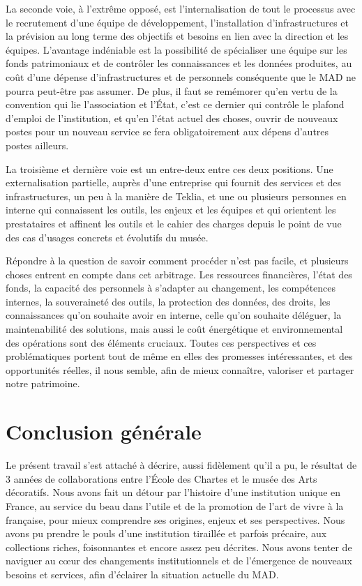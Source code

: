 La seconde voie, à l'extrême opposé, est l'internalisation de tout le processus avec le recrutement d'une équipe de développement, l'installation d'infrastructures et la prévision au long terme des objectifs et besoins en lien avec la direction et les équipes. L'avantage indéniable est la possibilité de spécialiser une équipe sur les fonds patrimoniaux et de contrôler les connaissances et les données produites, au coût d'une dépense d'infrastructures et de personnels conséquente que le MAD ne pourra peut-être pas assumer. De plus, il faut se remémorer qu'en vertu de la convention qui lie l'association et l'État, c'est ce dernier qui contrôle le plafond d'emploi de l'institution, et qu'en l'état actuel des choses, ouvrir de nouveaux postes pour un nouveau service se fera obligatoirement aux dépens d'autres postes ailleurs. 

La troisième et dernière voie est un entre-deux entre ces deux positions. Une externalisation partielle, auprès d'une entreprise qui fournit des services et des infrastructures, un peu à la manière de Teklia, et une ou plusieurs personnes en interne qui connaissent les outils, les enjeux et les équipes et qui orientent les prestataires et affinent les outils et le cahier des charges depuis le point de vue des cas d'usages concrets et évolutifs du musée.

Répondre à la question de savoir comment procéder n'est pas facile, et plusieurs choses entrent en compte dans cet arbitrage. Les ressources financières, l'état des fonds, la capacité des personnels à s'adapter au changement, les compétences internes, la souveraineté des outils, la protection des données, des droits, les connaissances qu'on souhaite avoir en interne, celle qu'on souhaite déléguer, la maintenabilité des solutions, mais aussi le coût énergétique et environnemental des opérations sont des éléments cruciaux. Toutes ces perspectives et ces problématiques portent tout de même en elles des promesses intéressantes, et des opportunités réelles, il nous semble, afin de mieux connaître, valoriser et partager notre patrimoine. 

\chapter*{Conclusion générale}

Le présent travail s'est attaché à décrire, aussi fidèlement qu'il a pu, le résultat de 3 années de collaborations entre l'École des Chartes et le musée des Arts décoratifs. Nous avons fait un détour par l'histoire d'une institution unique en France, au service du beau dans l'utile et de la promotion de l'art de vivre à la française, pour mieux comprendre ses origines, enjeux et ses perspectives. Nous avons pu prendre le pouls d'une institution tiraillée et parfois précaire, aux collections riches, foisonnantes et encore assez peu décrites. Nous avons tenter de naviguer au cœur des changements institutionnels et de l'émergence de nouveaux besoins et services, afin d'éclairer la situation actuelle du MAD. 

